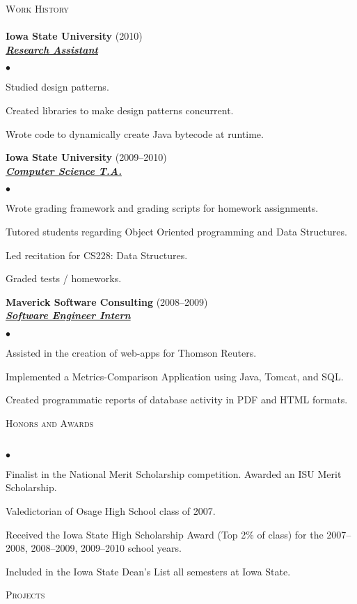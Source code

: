 \documentclass{article}
\newcommand{\lineunder} {
	\vspace*{-8pt} \\ \hspace*{-18pt} \hrulefill \\
}
\newcommand{\header}[1] {
	{\hspace*{-15pt}\vspace*{6pt} \textsc{#1}} \vspace*{-6pt} \lineunder
}
\newcommand{\employer}[3] {
	{ \textbf{#1} (#2)\\ \underline{\textbf{\emph{#3}}}\\  }
}
\newenvironment{achievements} {
	\begin{list}{$\bullet$}
		{\topsep 0pt \itemsep -2pt}
	}{
		\vspace*{4pt}\end{list}
	}
\begin{document}
\header{Work History}

	\employer{Iowa State University}{2010}{Research Assistant}
		\begin{achievements}
			\item{Studied design patterns.}
			\item{Created libraries to make design patterns concurrent.}
			\item{Wrote code to dynamically create Java bytecode at runtime.}
		\end{achievements}

	\employer{Iowa State University}{2009--2010}{Computer Science T.A.}
		\begin{achievements}
			\item{Wrote grading framework and grading scripts for homework assignments.}
			\item{Tutored students regarding Object Oriented programming and Data Structures.}
			\item{Led recitation for CS228: Data Structures.}
			\item{Graded tests / homeworks.}
		\end{achievements}

	\employer{Maverick Software Consulting}{2008--2009}{Software Engineer Intern}
		\begin{achievements}
			\item{Assisted in the creation of web-apps for Thomson Reuters.}
			\item{Implemented a Metrics-Comparison Application using Java, Tomcat, and SQL.}
			\item{Created programmatic reports of database activity in PDF and HTML formats.}
		\end{achievements}


\header{Honors and Awards}

	\begin{achievements}
		\item{Finalist in the National Merit Scholarship competition. Awarded an ISU Merit Scholarship.}
		\item{Valedictorian of Osage High School class of 2007.}
		\item{Received the Iowa State High Scholarship Award (Top 2\% of class) for the 2007--2008, 2008--2009, 2009--2010 school years.}
		\item{Included in the Iowa State Dean's List all semesters at Iowa State.}
	\end{achievements}

\header{Projects}
\end{document}
